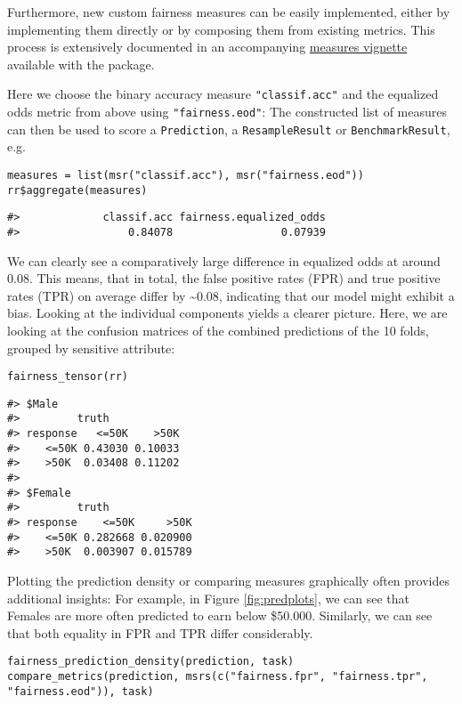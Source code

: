Furthermore, new custom fairness measures can be easily implemented, either by implementing them directly or by composing them from existing metrics.
This process is extensively documented in an accompanying \href{https://mlr3fairness.mlr-org.com/articles/measures-vignette.html}{measures vignette} available with the package.

Here we choose the binary accuracy measure \texttt{"classif.acc"} and the equalized odds metric from above using \texttt{"fairness.eod"}:
The constructed list of measures can then be used to score a \texttt{Prediction}, a \texttt{ResampleResult} or \texttt{BenchmarkResult}, e.g.

\begin{verbatim}
measures = list(msr("classif.acc"), msr("fairness.eod"))
rr$aggregate(measures)
\end{verbatim}

\begin{verbatim}
#>             classif.acc fairness.equalized_odds 
#>                 0.84078                 0.07939
\end{verbatim}

We can clearly see a comparatively large difference in equalized odds at around 0.08.
This means, that in total, the false positive rates (FPR) and true positive rates (TPR) on average differ by \textasciitilde0.08, indicating that our model might exhibit a bias.
Looking at the individual components yields a clearer picture.
Here, we are looking at the confusion matrices of the combined predictions of the 10 folds, grouped by sensitive attribute:

\begin{verbatim}
fairness_tensor(rr)
\end{verbatim}

\begin{verbatim}
#> $Male
#>         truth
#> response   <=50K    >50K
#>    <=50K 0.43030 0.10033
#>    >50K  0.03408 0.11202
#> 
#> $Female
#>         truth
#> response    <=50K     >50K
#>    <=50K 0.282668 0.020900
#>    >50K  0.003907 0.015789
\end{verbatim}

Plotting the prediction density or comparing measures graphically often provides additional insights:
For example, in Figure \ref{fig:predplots}, we can see that Females are more often predicted to earn below \$50.000.
Similarly, we can see that both equality in FPR and TPR differ considerably.

\begin{verbatim}
fairness_prediction_density(prediction, task)
compare_metrics(prediction, msrs(c("fairness.fpr", "fairness.tpr", "fairness.eod")), task)
\end{verbatim}

